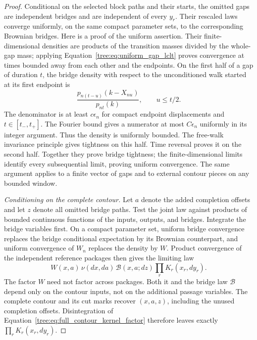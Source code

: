 \begin{proof}
Conditional on the selected block paths and their starts, the omitted
gaps are independent bridges and are independent of every $y_r$.
Their rescaled laws converge uniformly, on the same compact parameter
sets, to the corresponding Brownian bridges.  Here is a proof of the
uniform assertion.  Their finite-dimensional densities are products
of the transition masses divided by the whole-gap mass; applying
Equation~\eqref{tree:eq:uniform_gap_lclt} proves convergence at times
bounded away from each other and the endpoints.  On the first half
of a gap of duration $t$, the bridge density with respect to the
unconditioned walk started at its first endpoint is
\[
 \frac{p_{n(t-u)}(k-X_{nu})}{p_{nt}(k)},\qquad u\leq t/2.
\]
The denominator is at least $c\epsilon_n$ for compact endpoint
displacements and $t\in[t_-,t_+]$.  The Fourier bound gives a numerator
at most $C\epsilon_n$ uniformly in its integer argument.  Thus the
density is uniformly bounded.  The free-walk invariance principle
gives tightness on this half.  Time reversal proves it on the second
half.  Together they prove bridge tightness; the finite-dimensional
limits identify every subsequential limit, proving uniform convergence.
The same argument applies to a finite vector of gaps and to external
contour pieces on any bounded window.

\emph{Conditioning on the complete contour.}
Let $a$ denote the added completion offsets and let $z$ denote all
omitted bridge paths.  Test the joint law against products of bounded
continuous functions of the inputs, outputs, and bridges.  Integrate
the bridge variables first.  On a compact parameter set, uniform
bridge convergence replaces the bridge conditional expectation by
its Brownian counterpart, and uniform convergence of $W_n$ replaces
the density by $W$.  Product convergence of the independent reference
packages then gives the limiting law
\begin{equation}\label{tree:eq:full_contour_kernel_factor}
 W(x,a)\,\nu(dx,da)\,\mathcal B(x,a;dz)
       \prod_r K_r(x_r,dy_r).
\end{equation}
The factor $W$ need not factor across packages.  Both it and the
bridge law $\mathcal B$ depend only on the contour inputs, not on
the additional passage variables.  The complete contour and its
cut marks recover $(x,a,z)$, including the unused completion offsets.
Disintegration of Equation~\eqref{tree:eq:full_contour_kernel_factor}
therefore leaves exactly $\prod_rK_r(x_r,dy_r)$.


\end{proof}
